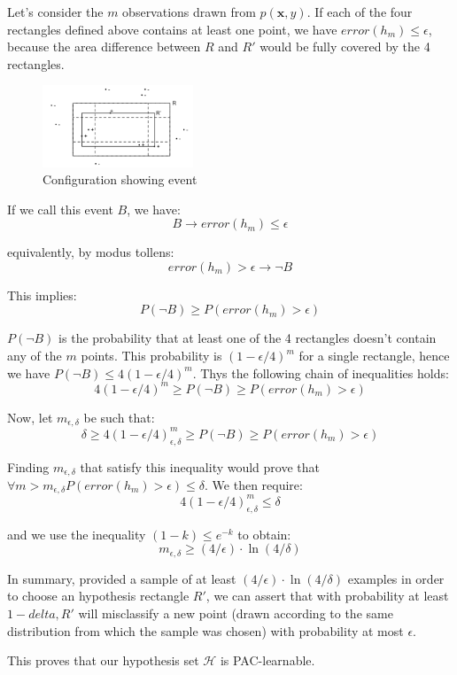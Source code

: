 \begin{exampleblock}
Let's consider the $m$ observations drawn from $p(\textbf{x}, y)$. If each of the four rectangles defined above contains at least one point, we have $error(h_m) \leq \epsilon$, because the area difference between $R$ and $R'$ would be fully covered by the 4 rectangles. 

\begin{figure}[H]
    \centering
    \includegraphics[width=0.4\textwidth]{assets/fig10.png}
    \caption{Configuration showing event}
    \label{fig:fig10}
\end{figure}

If we call this event $B$, we have: 
\[ 
    B \to error(h_m) \leq \epsilon 
\]

equivalently, by modus tollens:
\[ 
    error(h_m) > \epsilon \to \neg B
\]

This implies: 
\[ 
    P(\neg B) \geq P(error(h_m) > \epsilon)
\]

$P(\neg B)$ is the probability that at least one of the 4 rectangles doesn't contain any of the $m$ points. This probability is $(1-\epsilon/4)^m$ for a single rectangle, hence we have $P(\neg B) \leq 4(1-\epsilon/4)^m$. Thys the following chain of inequalities holds:
\[
    4(1-\epsilon/4)^m \geq P(\neg B) \geq P(error(h_m) > \epsilon)
\] 

Now, let $m_{\epsilon, \delta}$ be such that:
\[
    \delta \geq 4(1-\epsilon/4)^m_{\epsilon, \delta} \geq P(\neg B) \geq P(error(h_m) > \epsilon)
\]

Finding $m_{\epsilon, \delta}$ that satisfy this inequality would prove that $\forall m > m_{\epsilon, \delta}P(error(h_m) > \epsilon) \leq \delta$. We then require:
\[
    4(1-\epsilon/4)^m_{\epsilon, \delta} \leq \delta
\]

and we use the inequality $(1-k) \leq e^{-k}$ to obtain:
\[
    m_{\epsilon, \delta} \geq (4/\epsilon) \cdot \ln(4/\delta)
\]

In summary, provided a sample of at least $(4/\epsilon) \cdot \ln(4/\delta)$ examples in order to choose an hypothesis rectangle $R'$, we can assert that with probability at least $1- delta, R'$ will misclassify a new point (drawn according to the same distribution from which the sample was chosen) with probability at most $\epsilon$. 

This proves that our hypothesis set $\mathcal{H}$ is PAC-learnable.



\end{exampleblock}



